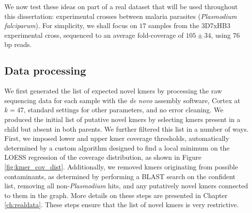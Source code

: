 We now test these ideas on part of a real dataset that will be used throughout this dissertation: experimental crosses between malaria parasites (\textit{Plasmodium falciparum}).  For simplicity, we shall focus on $17$ samples from the 3D7xHB3 experimental cross, sequenced to an average fold-coverage of $105 \pm 34$, using $76$ bp reads.


%

\subsection{Data processing}
We first generated the list of expected novel kmers by processing the raw sequencing data for each sample with the \textit{de novo} assembly software, Cortex\cite{Iqbal:2012fx} at $k=47$, standard settings for other parameters, and no error cleaning.  We produced the initial list of putative novel kmers by selecting kmers present in a child but absent in both parents.  We further filtered this list in a number of ways.  First, we imposed lower and upper kmer coverage thresholds, automatically determined by a custom algorithm designed to find a local minimum on the LOESS regression of the coverage distribution, as shown in Figure \ref{fig:kmer_cov_dist}.  Additionally, we removed kmers originating from possible contaminants, as determined by performing a BLAST search on the confident list, removing all non-\textit{Plasmodium} hits, and any putatively novel kmers connected to them in the graph.  More details on these steps are presented in Chapter \ref{ch:realdata}.  These steps ensure that the list of novel kmers is very restrictive.

